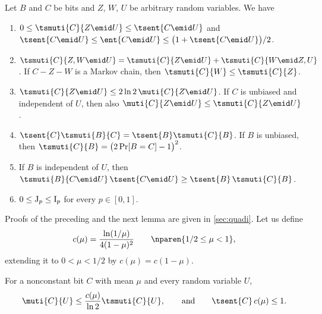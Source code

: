 \begin{lemma}
\label{lem:tsallis-properties}
Let $B$ and $C$ be bits and $Z$, $W$, $U$ be arbitrary
random variables. We have
\leavevmode
\begin{enumerate}
\setlength{\itemsep}{4pt}
\item\label{item:tsallis-bounds}
$0\le\tsmuti{C}{Z\emid U}\le\tsent{C\emid U}$ and
$\tsent{C\emid U}\le\ent{C\emid U}
\le\bigl(1+\tsent{C\emid U}\bigr)/2$.
\item\label{item:tsallis-chain}
$\tsmuti{C}{Z,W\emid U}
=\tsmuti{C}{Z\emid U}+\tsmuti{C}{W\emid Z,U}$.
If $C-Z-W$ is a Markov chain, then
$\tsmuti{C}{W}\le\tsmuti{C}{Z}$.
\item\label{item:tsallis-shannon}
$\tsmuti{C}{Z\emid U}\le2\ln2\,\muti{C}{Z\emid U}$.
If $C$ is unbiased and independent of $U$, then also
$\muti{C}{Z\emid U}\le\tsmuti{C}{Z\emid U}$.
\item\label{item:tsallis-bits}
$\tsent{C}\tsmuti{B}{C}=\tsent{B}\tsmuti{C}{B}$.
If $B$ is unbiased, then
$\tsmuti{C}{B}=\bigl(2\Pr[B=C]-1\bigr)^2$.
\item\label{item:tsallis-conditioning}
If $B$ is independent of $U$, then
$\tsmuti{B}{C\emid U}\,\tsent{C\emid U}
\ge\tsent{B}\,\tsmuti{C}{B}$.
\item\label{item:tsallis-noise}
$0\le\mathrm{J}_p\le\mathrm{I}_p$ for every $p\in[0,1]$.
\end{enumerate}
\end{lemma}

Proofs of the preceding and the next lemma are given in
\autoref{sec:quadi}. Let us define
\begin{equation*}
  c(\mu)=\frac{\ln(1/\mu)}{4(1-\mu)^2}
  \qquad\nparen{1/2\le\mu<1},
\end{equation*}
extending it to $0<\mu<1/2$ by $c(\mu)=c(1-\mu)$.

\begin{lemma}
\label{lem:biased-comparison}
For a nonconstant bit $C$ with mean $\mu$ and every random variable $U$,
\begin{equation*}
  \muti{C}{U}\le\frac{c(\mu)}{\ln2}\tsmuti{C}{U},
  \qquad\text{and}\qquad
  \tsent{C}\,c(\mu)\le1.
\end{equation*}
\end{lemma}
